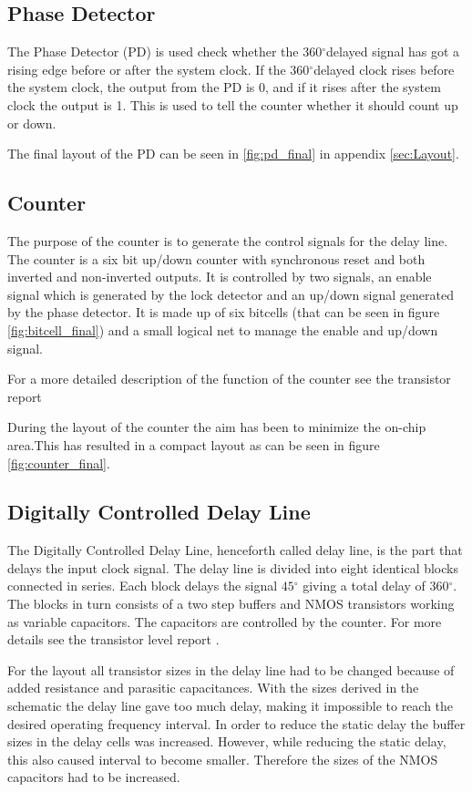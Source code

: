 \documentclass[a4paper,12pt]{article} \usepackage{graphicx}
\newcommand{\degree}{\ensuremath{^\circ}}
\begin{document}
\subsection{Phase Detector}
The Phase Detector (PD) is used check whether the 360\degree delayed
signal has got a rising edge before or after the system clock. If the
360\degree delayed clock rises before the system clock, the output
from the PD is 0, and if it rises after the system clock the output is 1.
This is used to tell the counter whether it should count up or down. 

The final layout of the PD can be seen in \ref{fig:pd_final} in appendix \ref{sec:Layout}.
\subsection{Counter}
The purpose of the counter is to generate the control signals for the delay line.
The counter is a six bit up/down counter with synchronous reset and both
inverted and non-inverted outputs. It is controlled by two signals, an enable
signal which is generated by the lock detector and an up/down signal generated
by the phase detector. It is made up of six bitcells (that can be seen in figure \ref{fig:bitcell_final}) and a small logical net to
manage the enable and up/down signal.

For a more detailed description of the function of the counter see the transistor report \cite{transistor} 

During the layout of the counter the aim has been to minimize the on-chip area.This has resulted in a compact layout as can be seen in figure \ref{fig:counter_final}.

\subsection{Digitally Controlled Delay Line}
\label{sec:del}
The Digitally Controlled Delay Line, henceforth called delay line, is the part
that delays the input clock signal. The delay line is divided into eight
identical blocks connected in series. Each block delays the signal $45\degree$
giving a total delay of 360\degree. The blocks in turn consists of a two step
buffers and NMOS transistors working as variable capacitors. The capacitors are
controlled by the counter. For more details see the transistor level report
\cite{transistor}.

For the layout all transistor sizes in the delay line had to be changed because
of added resistance and parasitic capacitances. With the sizes derived in the
schematic the delay line gave too much delay, making it impossible to reach the
desired operating frequency interval. In order to reduce the static delay the
buffer sizes in the delay cells was increased. However, while reducing the
static delay, this also caused interval to become smaller. Therefore the sizes
of the NMOS capacitors had to be increased.
\end{document}
